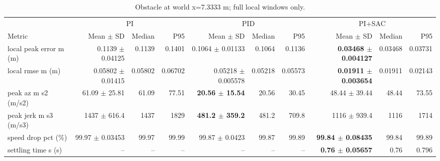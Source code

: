 \begin{table}[t]
\centering
\scriptsize
\caption{Obstacle at world x=7.3333 m; full local windows only.}
\label{tab:obstacle-11}
\begin{tabular}{p{}*{9}{r}}
\toprule
 & \multicolumn{3}{c}{PI} & \multicolumn{3}{c}{PID} & \multicolumn{3}{c}{PI+SAC} \\
\cmidrule(lr){2-4}\cmidrule(lr){5-7}\cmidrule(lr){8-10}
Metric & Mean $\pm$ SD & Median & P95 & Mean $\pm$ SD & Median & P95 & Mean $\pm$ SD & Median & P95 \\
\midrule
local peak error m (m) & 0.1139 $\pm$ 0.04125 & 0.1139 & 0.1401 & 0.1064 $\pm$ 0.01133 & 0.1064 & 0.1136 & \textbf{0.03468 $\pm$ 0.004127} & 0.03468 & 0.03731 \\
local rmse m (m) & 0.05802 $\pm$ 0.01415 & 0.05802 & 0.06702 & 0.05218 $\pm$ 0.005578 & 0.05218 & 0.05573 & \textbf{0.01911 $\pm$ 0.003654} & 0.01911 & 0.02143 \\
peak az m s2 (m/s2) & 61.09 $\pm$ 25.81 & 61.09 & 77.51 & \textbf{20.56 $\pm$ 15.54} & 20.56 & 30.45 & 48.44 $\pm$ 39.44 & 48.44 & 73.55 \\
peak jerk m s3 (m/s3) & 1437 $\pm$ 616.4 & 1437 & 1829 & \textbf{481.2 $\pm$ 359.2} & 481.2 & 709.8 & 1116 $\pm$ 939.4 & 1116 & 1714 \\
speed drop pct (\%) & 99.97 $\pm$ 0.03453 & 99.97 & 99.99 & 99.87 $\pm$ 0.0423 & 99.87 & 99.89 & \textbf{99.84 $\pm$ 0.08435} & 99.84 & 99.89 \\
settling time s (s) & -- & -- & -- & -- & -- & -- & \textbf{0.76 $\pm$ 0.05657} & 0.76 & 0.796 \\
\bottomrule
\end{tabular}
\end{table}
